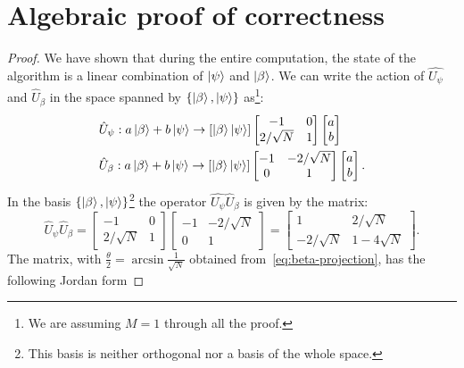 \section{Algebraic proof of correctness}
\begin{proof}
We have shown that during the entire computation, the state of the algorithm is a linear combination of $\ket{\psi}$ and $\ket{\beta}$. We can write the action of $\hat{U_\psi}$ and $\hat{U}_\beta$ in the space spanned by $\{\ket{\beta}, \ket{\psi}\}$ as\footnote{We are assuming $M=1$ through all the proof.}:
\begin{align*}
    &\hat{U}_\psi : a\ket{\beta} + b\ket{\psi} \rightarrow [\ket{\beta}\ket{\psi}] \begin{bmatrix}
    -1 & 0 \\
    2/\sqrt{N} & 1
    \end{bmatrix} 
    \begin{bmatrix}
    a \\
    b
    \end{bmatrix} \\
    &\hat{U}_\beta : a\ket{\beta} + b\ket{\psi} \rightarrow [\ket{\beta}\ket{\psi}] \begin{bmatrix}
    -1 & -2/\sqrt{N} \\
    0 & 1
    \end{bmatrix} 
    \begin{bmatrix}
    a \\
    b
    \end{bmatrix}.
\end{align*}
In the basis $\{\ket{\beta}, \ket{\psi}\}$\footnote{This basis is neither orthogonal nor a basis of the whole space.} the operator $\hat{U_\psi}\hat{U}_\beta$ is given by the matrix:
\begin{equation*}
    \hat{U}_\psi\hat{U}_\beta = \begin{bmatrix}
    -1 & 0 \\
    2/\sqrt{N} & 1
    \end{bmatrix} 
    \begin{bmatrix}
    -1 & -2/\sqrt{N} \\
    0 & 1
    \end{bmatrix}  =
    \begin{bmatrix}
    1 & 2/\sqrt{N} \\
    -2/\sqrt{N} & 1-4\sqrt{N}
    \end{bmatrix}.
\end{equation*}
The matrix, with $\frac{\theta}{2} = \arcsin{\frac{1}{\sqrt{N}}}$ obtained from~\ref{eq:beta-projection}, has the following Jordan form

\end{proof}
